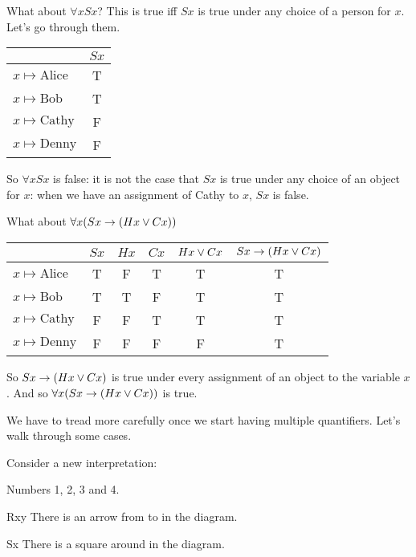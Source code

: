 What about $\forall x Sx$? This is true iff $Sx$ is true under any choice of a person for $x$. Let's go through them. \begin{center}
\begin{tabular}{l|c}
&$Sx$\Bstrut\\\hline\Tstrut
$x\mapsto\text{Alice}$&T\\
$x\mapsto \text{Bob}$&T\\
$x\mapsto \text{Cathy}$&F\\
$x\mapsto \text{Denny}$&F
\end{tabular}
\end{center}So $\forall x Sx$ is false: it is not the case that $Sx$ is true under any choice of an object for $x$: when we have an assignment of Cathy to $x$, $Sx$ is false.

What about $\forall x(Sx\rightarrow (Hx\vee Cx))$
\begin{center}
\begin{tabular}{l|ccccc}
&$Sx$&$Hx$&$Cx$&$Hx\vee Cx$&$Sx\rightarrow (Hx\vee Cx)$\Bstrut\\\hline\Tstrut
$x\mapsto\text{Alice}$&T&F&T&T&T\\
$x\mapsto \text{Bob}$&T&T&F&T&T\\
$x\mapsto \text{Cathy}$&F&F&T&T&T\\
$x\mapsto \text{Denny}$&F&F&F&F&T
\end{tabular}
\end{center}
So $Sx\rightarrow (Hx\vee Cx)$  is true under every assignment of an object to the variable $x$. And so $\forall x(Sx\rightarrow (Hx\vee Cx))$ is true.



We have to tread more carefully once we start having multiple quantifiers. Let's walk through some cases.

Consider a new interpretation: \begin{center}

 \begin{ekey}
\item[\text{domain}] Numbers 1, 2, 3 and 4.
\item[Rxy] There is an arrow from  to  in the diagram.
\item[Sx] There is a square around  in the diagram.
\end{ekey}
\end{center}

